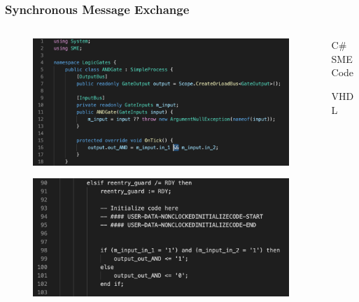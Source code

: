 \documentclass{beamer}
\begin{document}
    \begin{frame}
        \frametitle{Synchronous Message Exchange}

        
    
        \begin{columns}[T] 
            \begin{column}[T]{8cm}
                \centering
                \vspace*{-1cm}
                \begin{figure}
                    \includegraphics[scale=0.3]{"Pictures and plots/ANDSME"}
                \end{figure}
                \vspace*{-0.5cm}
                \begin{figure}
                    \includegraphics[scale=0.3]{"Pictures and plots/ANDVHDL1"}
                \end{figure}  
                
                
            \end{column}
            \begin{column}[T]{5cm} 
                \vspace*{1cm}
                
                C\# SME Code
                \vspace*{2.5cm}
                
                VHDL
            \end{column}
        \end{columns}
        
        
    \end{frame}
\end{document}
